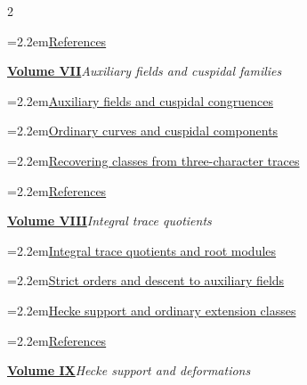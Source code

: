 \documentclass[a4paper,11pt]{article}
\theoremstyle{definition}
\theoremstyle{remark}
\numberwithin{equation}{section}
\begin{document}
\begin{multicols}{2}
\begin{minipage}{\linewidth}
\noindent\hangindent=2.2em\hyperref[nav:bibliography-VI]{References}\par
\end{minipage}\par\medskip
\noindent\begin{minipage}{\linewidth}\raggedright
\textbf{\hyperref[nav:volume-VII]{Volume VII}}\enspace\emph{Auxiliary fields and cuspidal families}\par\smallskip
\noindent\hangindent=2.2em\hyperref[nav:g-IV-5]{Auxiliary fields and cuspidal congruences}\par
\noindent\hangindent=2.2em\hyperref[nav:chapter-ordinary-families]{Ordinary curves and cuspidal components}\par
\noindent\hangindent=2.2em\hyperref[nav:chapter-three-character-traces]{Recovering classes from three-character traces}\par
\noindent\hangindent=2.2em\hyperref[nav:bibliography-VII]{References}\par
\end{minipage}\par\medskip
\noindent\begin{minipage}{\linewidth}\raggedright
\textbf{\hyperref[nav:volume-VIII]{Volume VIII}}\enspace\emph{Integral trace quotients}\par\smallskip
\noindent\hangindent=2.2em\hyperref[nav:chapter-integral-trace-quotients]{Integral trace quotients and root modules}\par
\noindent\hangindent=2.2em\hyperref[nav:chapter-descent-strict-orders]{Strict orders and descent to auxiliary fields}\par
\noindent\hangindent=2.2em\hyperref[nav:chapter-ordinary-hecke]{Hecke support and ordinary extension classes}\par
\noindent\hangindent=2.2em\hyperref[nav:bibliography-VIII]{References}\par
\end{minipage}\par\medskip
\noindent\begin{minipage}{\linewidth}\raggedright
\textbf{\hyperref[nav:volume-IX]{Volume IX}}\enspace\emph{Hecke support and deformations}\par\smallskip

\end{minipage}
\end{multicols}
\end{document}
